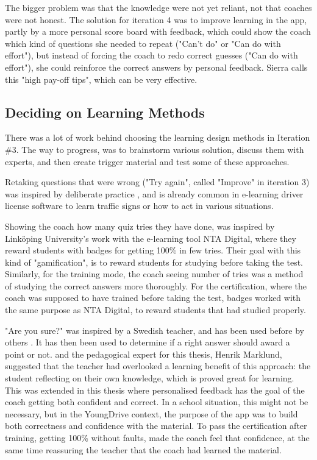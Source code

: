   The bigger problem was that the knowledge were not yet reliant, not that coaches were not honest. The solution for iteration 4 was to improve learning in the app, partly by a more personal score board with feedback, which could show the coach which kind of questions she needed to repeat ("Can't do" or "Can do with effort"), but instead of forcing the coach to redo correct guesses ("Can do with effort"), she could reinforce the correct answers by personal feedback. Sierra \cite{sierra} calls this "high pay-off tips", which can be very effective.

  \subsection{Deciding on Learning Methods}
  There was a lot of work behind choosing the learning design methods in Iteration \#3. The way to progress, was to brainstorm various solution, discuss them with experts, and then create trigger material and test some of these approaches.

  Retaking questions that were wrong ("Try again", called "Improve" in iteration 3) was inspired by deliberate practice \cite{sierra}, and is already common in e-learning driver license software to learn traffic signs or how to act in various situations.

  Showing the coach how many quiz tries they have done, was inspired by Linköping University's work with the e-learning tool NTA Digital, where they reward students with badges for getting 100\% in few tries. Their goal with this kind of "gamification", is to reward students for studying before taking the test. Similarly, for the training mode, the coach seeing number of tries was a method of studying the correct answers more thoroughly. For the certification, where the coach was supposed to have trained before taking the test, badges worked with the same purpose as NTA Digital, to reward students that had studied properly.


  "Are you sure?" was inspired by a Swedish teacher, and has been used before by others \citep{nicol}. It has then been used to determine if a right answer should award a point or not. \cite{nicol} and the pedagogical expert for this thesis, Henrik Marklund, suggested that the teacher had overlooked a learning benefit of this approach: the student reflecting on their own knowledge, which is proved great for learning. This was extended in this thesis where personalised feedback has the goal of the coach getting both confident and correct. In a school situation, this might not be necessary, but in the YoungDrive context, the purpose of the app was to build both correctness and confidence with the material. To pass the certification after training, getting 100\% without faults, made the coach feel that confidence, at the same time reassuring the teacher that the coach had learned the material.

